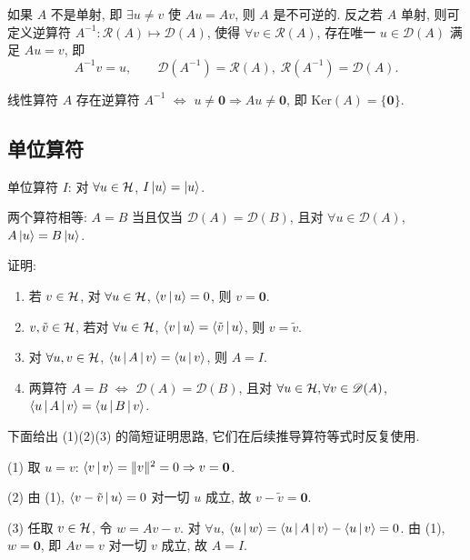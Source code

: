 如果 $A$ 不是单射, 即 $\exists u\neq v$ 使 $Au=Av$, 则 $A$ 是不可逆的. 反之若 $A$ 单射, 则可定义逆算符 $A^{-1}:\mathscr R(A)\mapsto \mathscr D(A)$, 使得 $\forall v\in\mathscr R(A)$, 存在唯一 $u\in\mathscr D(A)$ 满足 $Au=v$, 即
\begin{equation}
A^{-1}v=u,\qquad \mathscr D(A^{-1})=\mathscr R(A),\;\mathscr R(A^{-1})=\mathscr D(A).
\end{equation}

\begin{proposition}\label{prop:invertibility}
线性算符 $A$ 存在逆算符 $A^{-1}$ $\Longleftrightarrow$ $u\neq \mathbf 0\Rightarrow Au\neq \mathbf 0$, 即 $\mathrm{Ker}(A)=\{\mathbf 0\}$.
\end{proposition}

\subsection{单位算符}\label{subsec:identity}

\begin{definition}[单位算符]
单位算符 $I$: 对 $\forall u\in\mathcal{H}$, $I\ket u=\ket u$.
\end{definition}

两个算符相等: $A=B$ 当且仅当 $\mathscr D(A)=\mathscr D(B)$, 且对 $\forall u\in\mathscr D(A)$, $A\ket u=B\ket u$.

\begin{remark}[作业 1]
证明:
\begin{enumerate}
    \item 若 $v\in\mathcal{H}$, 对 $\forall u\in\mathcal{H}$, $\left\langle v \,\middle|\, u \right\rangle=0$, 则 $v=\mathbf 0$.
    \item $v,\tilde v\in\mathcal{H}$, 若对 $\forall u\in\mathcal{H}$, $\left\langle v \,\middle|\, u \right\rangle=\left\langle \tilde v \,\middle|\, u \right\rangle$, 则 $v=\tilde v$.
    \item 对 $\forall u,v\in\mathcal{H}$, $\left\langle u \,\middle|\, A \,\middle|\, v \right\rangle=\left\langle u \,\middle|\, v \right\rangle$, 则 $A=I$.
    \item 两算符 $A=B$ $\Leftrightarrow$ $\mathscr D(A)=\mathscr D(B)$, 且对 $\forall u\in\mathcal{H},\forall v\in\mathscr D(A)$, $\left\langle u \,\middle|\, A \,\middle|\, v \right\rangle=\left\langle u \,\middle|\, B \,\middle|\, v \right\rangle$.
\end{enumerate}
\end{remark}

下面给出 (1)(2)(3) 的简短证明思路, 它们在后续推导算符等式时反复使用.

\begin{proof*}
(1) 取 $u=v$: $\left\langle v \,\middle|\, v \right\rangle=\|v\|^{2}=0\Rightarrow v=\mathbf 0$.

(2) 由 (1), $\left\langle v-\tilde v \,\middle|\, u \right\rangle=0$ 对一切 $u$ 成立, 故 $v-\tilde v=\mathbf 0$.

(3) 任取 $v\in\mathcal{H}$, 令 $w=A v-v$. 对 $\forall u$, $\left\langle u \,\middle|\, w \right\rangle=\left\langle u \,\middle|\, A \,\middle|\, v \right\rangle-\left\langle u \,\middle|\, v \right\rangle=0$. 由 (1), $w=\mathbf 0$, 即 $A v=v$ 对一切 $v$ 成立, 故 $A=I$.
\end{proof*}


